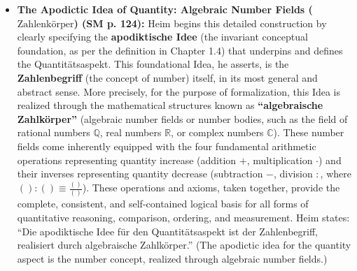 \documentclass[12pt]{article}
\newcommand{\q}[1]{\enquote{#1}}
\newcommand{\zahlenkoerper}{\text{Zahlenkörper}}
\begin{document}
\begin{itemize}
    \item \textbf{The Apodictic Idea of Quantity: Algebraic Number Fields (\(\zahlenkoerper\)) (SM p. 124):}
    Heim begins this detailed construction by clearly specifying the \textbf{apodiktische Idee} (the invariant conceptual foundation, as per the definition in Chapter 1.4) that underpins and defines the Quantitätsaspekt. This foundational Idea, he asserts, is the \textbf{Zahlenbegriff} (the concept of number) itself, in its most general and abstract sense. More precisely, for the purpose of formalization, this Idea is realized through the mathematical structures known as \textbf{\q{algebraische Zahlkörper}} (algebraic number fields or number bodies, such as the field of rational numbers \( \mathbb{Q} \), real numbers \( \mathbb{R} \), or complex numbers \( \mathbb{C} \)). These number fields come inherently equipped with the four fundamental arithmetic operations representing quantity increase (addition \( + \), multiplication \( \cdot \)) and their inverses representing quantity decrease (subtraction \( - \), division \( : \), where \( ():() \equiv \frac{()}{()} \)). These operations and axioms, taken together, provide the complete, consistent, and self-contained logical basis for all forms of quantitative reasoning, comparison, ordering, and measurement. Heim states: \q{Die apodiktische Idee für den Quantitätsaspekt ist der Zahlenbegriff, realisiert durch algebraische Zahlkörper.} (The apodictic idea for the quantity aspect is the number concept, realized through algebraic number fields.)


\end{itemize}
\end{document}
